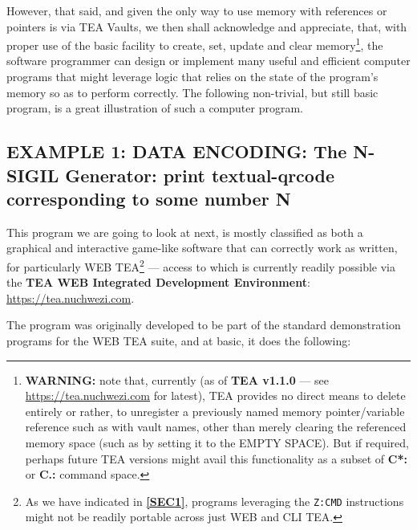 \documentclass[a4paper, 18pt]{book} %
\begin{document}
However, that said, and given the only way to use memory with references or pointers is via TEA Vaults, we then shall acknowledge and appreciate, that, with proper use of the basic facility to create, set, update and clear memory\footnote{\textbf{WARNING:} note that, currently (as of \textbf{TEA v1.1.0} --- see \url{https://tea.nuchwezi.com} for latest), TEA provides no direct means to delete entirely or rather, to unregister a previously named memory pointer/variable reference such as with vault names, other than merely clearing the referenced memory space (such as by setting it to the EMPTY SPACE). But if required, perhaps future TEA versions might avail this functionality as a subset of \textbf{C*:} or \textbf{C.:} command space.}, the software programmer can design or implement many useful and efficient computer programs that might leverage logic that relies on the state of the program's memory so as to perform correctly. The following non-trivial, but still basic program, is a great illustration of such a computer program.


\subsection{EXAMPLE 1: \textbf{DATA ENCODING:} The N-SIGIL Generator: print textual-qrcode corresponding to some number N}
\label{SECEXAMP1C}

This program we are going to look at next, is mostly classified as both a graphical and interactive game-like software that can correctly work as written, for particularly WEB TEA\footnote{As we have indicated in \textbf{\autoref{SEC1}}, programs leveraging the \texttt{Z:CMD} instructions might not be readily portable across just WEB and CLI TEA.} --- access to which is currently readily possible via the \textbf{TEA WEB Integrated Development Environment}: \url{https://tea.nuchwezi.com}.

The program was originally developed to be part of the standard demonstration programs for the WEB TEA suite, and at basic, it does the following:
\end{document}
